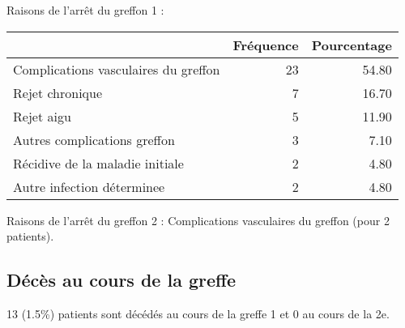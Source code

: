 \documentclass[11pt,a4paper]{article}\usepackage[]{graphicx}\usepackage[]{color}
\begin{document}
Raisons de l'arrêt du greffon 1 :
\begin{table}[H]
\centering
\begin{tabular}{lrr}
  \hline
 & Fréquence & Pourcentage \\ 
  \hline
Complications vasculaires du greffon &  23 & 54.80 \\ 
  Rejet chronique &   7 & 16.70 \\ 
  Rejet aigu &   5 & 11.90 \\ 
  Autres complications greffon &   3 & 7.10 \\ 
  Récidive de la maladie initiale &   2 & 4.80 \\ 
  Autre infection déterminee &   2 & 4.80 \\ 
   \hline
\end{tabular}
\end{table}


Raisons de l'arrêt du greffon 2 : Complications vasculaires du greffon  (pour 2 patients).

  \subsection{Décès au cours de la greffe}

13 (1.5\%) patients sont décédés au cours de la greffe 1 et 0 au cours de la 2e.
\end{document}
